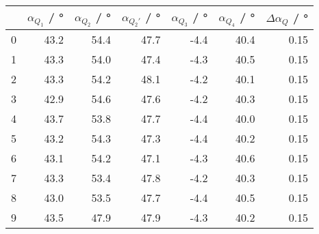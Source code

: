 \begin{tabular}{lrrrrrr}
	\toprule
	{} & $\alpha_{Q_1}$ / \si{\degree} & $\alpha_{Q_2}$ / \si{\degree} & $\alpha_{Q_2'}$ / \si{\degree} & $\alpha_{Q_3}$ / \si{\degree} & $\alpha_{Q_4}$ / \si{\degree} & $\Delta \alpha_{Q}$ / \si{\degree} \\
	\midrule
	0  & 43.2                          & 54.4                          & 47.7                           & -4.4                          & 40.4                          & 0.15                               \\
	1  & 43.3                          & 54.0                          & 47.4                           & -4.3                          & 40.5                          & 0.15                               \\
	2  & 43.3                          & 54.2                          & 48.1                           & -4.2                          & 40.1                          & 0.15                               \\
	3  & 42.9                          & 54.6                          & 47.6                           & -4.2                          & 40.3                          & 0.15                               \\
	4  & 43.7                          & 53.8                          & 47.7                           & -4.4                          & 40.0                          & 0.15                               \\
	5  & 43.2                          & 54.3                          & 47.3                           & -4.4                          & 40.2                          & 0.15                               \\
	6  & 43.1                          & 54.2                          & 47.1                           & -4.3                          & 40.6                          & 0.15                               \\
	7  & 43.3                          & 53.4                          & 47.8                           & -4.2                          & 40.3                          & 0.15                               \\
	8  & 43.0                          & 53.5                          & 47.7                           & -4.4                          & 40.5                          & 0.15                               \\
	9  & 43.5                          & 47.9                          & 47.9                           & -4.3                          & 40.2                          & 0.15                               \\
	\bottomrule
\end{tabular}
